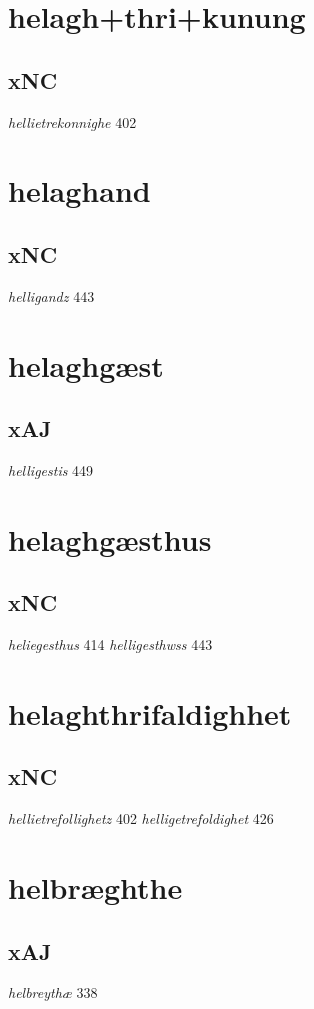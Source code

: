 \documentclass[a4paper,twocolumn]{article}
\begin{document}
\section{helagh+thri+kunung}
\label{sec:orgcae416a}
\subsection{xNC}
\label{sec:org65be954}
\emph{hellietrekonnighe} 402 
\section{helaghand}
\label{sec:org0d184f5}
\subsection{xNC}
\label{sec:org6edcd8e}
\emph{helligandz} 443 
\section{helaghgæst}
\label{sec:orgfb1aec0}
\subsection{xAJ}
\label{sec:orgdce5dad}
\emph{helligestis} 449 
\section{helaghgæsthus}
\label{sec:org1f1aabe}
\subsection{xNC}
\label{sec:orgff5c91c}
\emph{heliegesthus} 414 \emph{helligesthwss} 443 
\section{helaghthrifaldighhet}
\label{sec:orgb735948}
\subsection{xNC}
\label{sec:org455d780}
\emph{hellietrefollighetz} 402 \emph{helligetrefoldighet} 426 
\section{helbræghthe}
\label{sec:org6552572}
\subsection{xAJ}
\label{sec:org920cc80}
\emph{helbreythæ} 338 
\end{document}
